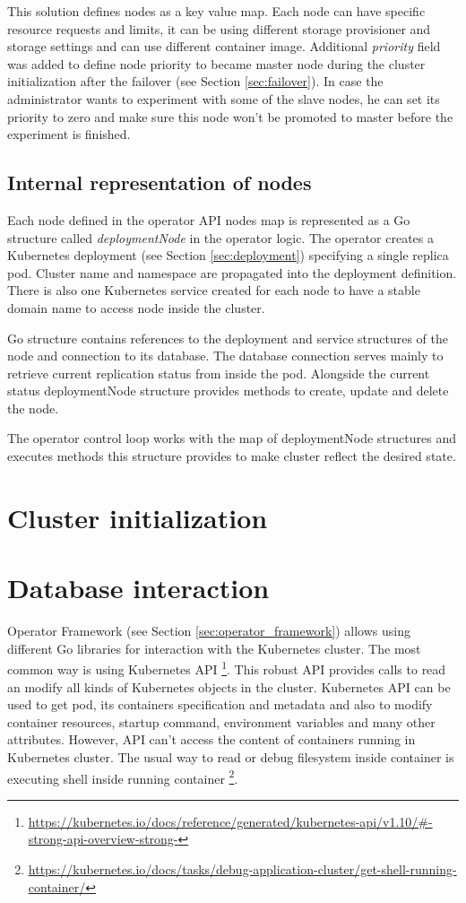 \documentclass[
  digital, %
  twoside, %
  table,   %
  lof,     %
  lot,     %
]{fithesis3}
\begin{document}
This solution defines nodes as a key value map. Each node can have specific resource requests and limits, it can be using different storage provisioner and storage settings and can use different container image. Additional \textit{priority} field was added to define node priority to became master node during the cluster initialization after the failover (see Section \ref{sec:failover}). In case the administrator wants to experiment with some of the slave nodes, he can set its priority to zero and make sure this node won't be promoted to master before the experiment is finished.

\subsection{Internal representation of nodes}
 Each node defined in the operator API nodes map is represented as a Go structure called \textit{deploymentNode} in the operator logic. The operator creates a Kubernetes deployment (see Section \ref{sec:deployment}) specifying a single replica pod. Cluster name and namespace are propagated into the deployment definition. There is also one Kubernetes service created for each node to have a stable domain name to access node inside the cluster.

 Go structure contains references to the deployment and service structures of the node and connection to its database. The database connection serves mainly to retrieve current replication status from inside the pod. Alongside the current status deploymentNode structure provides methods to create, update and delete the node.

 The operator control loop works with the map of deploymentNode structures and executes methods this structure provides to make cluster reflect the desired state.

\section{Cluster initialization}
\section{Database interaction}
Operator Framework (see Section \ref{sec:operator_framework}) allows using different Go libraries for interaction with the Kubernetes cluster. The most common way is using Kubernetes API \footnote{\url{https://kubernetes.io/docs/reference/generated/kubernetes-api/v1.10/\#-strong-api-overview-strong-}}. This robust API provides calls to read an modify all kinds of Kubernetes objects in the cluster. Kubernetes API can be used to get pod, its containers specification and metadata and also to modify container resources, startup command, environment variables and many other attributes. However, API can't access the content of containers running in Kubernetes cluster. The usual way to read or debug filesystem inside container is executing shell inside running container \footnote{\url{https://kubernetes.io/docs/tasks/debug-application-cluster/get-shell-running-container/}}.
\end{document}
